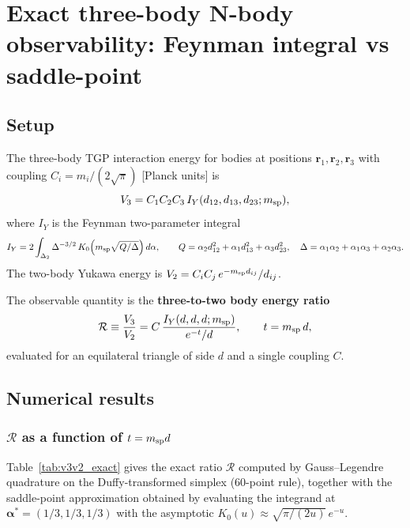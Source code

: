 \section{Exact three-body N-body observability: Feynman integral vs saddle-point}
\label{sec:ncrit_exact}

\subsection{Setup}

The three-body TGP interaction energy for bodies at positions
$\mathbf{r}_1,\mathbf{r}_2,\mathbf{r}_3$ with coupling $C_i = m_i/(2\sqrt{\pi})$
[Planck units] is
\begin{equation}
  V_3 = C_1 C_2 C_3\,I_Y(d_{12},d_{13},d_{23};m_{\rm sp}),
\end{equation}
where $I_Y$ is the Feynman two-parameter integral
\begin{equation}
  I_Y = 2\int_{\Delta_2} \Delta^{-3/2}\,K_0\!\left(m_{\rm sp}\sqrt{Q/\Delta}\right)d\alpha,
  \qquad
  Q = \alpha_2 d_{12}^2 + \alpha_1 d_{13}^2 + \alpha_3 d_{23}^2,
  \quad
  \Delta = \alpha_1\alpha_2+\alpha_1\alpha_3+\alpha_2\alpha_3.
\end{equation}
The two-body Yukawa energy is $V_2 = C_i C_j\,e^{-m_{\rm sp}d_{ij}}/d_{ij}$.

The observable quantity is the \textbf{three-to-two body energy ratio}
\begin{equation}
  \mathcal{R} \equiv \frac{V_3}{V_2} = C\,\frac{I_Y(d,d,d;m_{\rm sp})}{e^{-t}/d},
  \qquad t = m_{\rm sp}\,d,
\end{equation}
evaluated for an equilateral triangle of side $d$ and a single coupling $C$.

\subsection{Numerical results}

\subsubsection{$\mathcal{R}$ as a function of $t = m_{\rm sp}d$}

Table~\ref{tab:v3v2_exact} gives the exact ratio $\mathcal{R}$ computed by
Gauss--Legendre quadrature on the Duffy-transformed simplex (60-point rule),
together with the saddle-point approximation obtained by evaluating the
integrand at $\boldsymbol{\alpha}^* = (1/3,1/3,1/3)$ with the asymptotic
$K_0(u)\approx\sqrt{\pi/(2u)}\,e^{-u}$.

